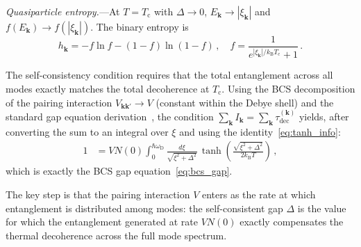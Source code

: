\documentclass[prb,twocolumn,superscriptaddress,longbibliography,floatfix]{revtex4-2}
\newcommand{\kB}{k_{\mathrm{B}}}
\newcommand{\tauasym}{\tau}
\newcommand{\taudec}{\tauasym_{\mathrm{dec}}}
\newcommand{\Tc}{T_{\mathrm{c}}}
\newcommand{\oD}{\omega_{\mathrm{D}}}
\newcommand{\Ek}{E_{\bm{k}}}
\newcommand{\xik}{\xi_{\bm{k}}}
\begin{document}
\textit{Quasiparticle entropy.}---At $T = \Tc$ with $\Delta \to 0$,
$\Ek \to |\xik|$ and $f(\Ek) \to f(|\xik|)$.  The binary entropy is
\begin{equation}
  h_{\bm{k}} = -f\ln f - (1-f)\ln(1-f)\,,
  \quad f = \frac{1}{e^{|\xik|/\kB\Tc}+1}\,.
\end{equation}

The self-consistency condition requires that the total entanglement
across all modes exactly matches the total decoherence at $\Tc$.
Using the BCS decomposition of the pairing interaction
$V_{\bm{k}\bm{k}'} \to V$ (constant within the Debye shell) and
the standard gap equation derivation~\cite{Tinkham2004}, the
condition $\sum_{\bm{k}} I_{\bm{k}} = \sum_{\bm{k}} \taudec^{(\bm{k})}$
yields, after converting the sum to an integral over $\xi$ and
using the identity~\eqref{eq:tanh_info}:
\begin{align}\label{eq:gap_from_tau}
  1 &= V N(0) \int_0^{\hbar\oD}
  \frac{d\xi}{\sqrt{\xi^2+\Delta^2}}\,
  \tanh\!\left(\frac{\sqrt{\xi^2+\Delta^2}}{2\kB T}\right)\,,
\end{align}
which is exactly the BCS gap equation~\eqref{eq:bcs_gap}.

The key step is that the pairing interaction $V$ enters as the
rate at which entanglement is distributed among modes: the
self-consistent gap $\Delta$ is the value for which the
entanglement generated at rate $V N(0)$ exactly compensates
the thermal decoherence across the full mode spectrum.

\end{document}
